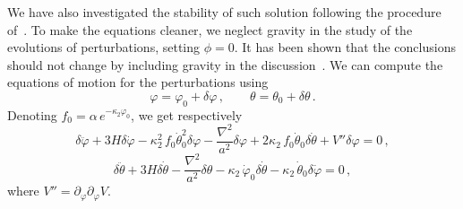 \documentclass[11pt,a4paper]{article}
\begin{document}
We have also investigated the stability of such solution following the procedure of~\cite{Boyle:2001du, Kasuya:2001pr}. To make the equations cleaner, we neglect gravity in the study of the evolutions of perturbations, setting $\phi = 0$. It has been shown that the conclusions should not change by including gravity in the discussion~\cite{Boyle:2001du}. We can compute the equations of motion for the perturbations using
\begin{equation}
\varphi = \varphi_0 + \delta \varphi \,, \qquad \theta = \theta_0 + \delta \theta \,.
\end{equation}
Denoting $f_0 = \alpha \, e^{-\kappa_2 \varphi_0}$, we get respectively
\begin{equation}
\label{eq:EOMdeltavarphi}
\delta \ddot\varphi + 3 H \delta \dot\varphi - \kappa_2^2 \, f_0 \dot\theta_0^2 \delta \varphi - \frac{\nabla^2}{a^2} \delta \varphi + 2 \kappa_2 \, f_0 \dot\theta_0 \delta \dot\theta + V'' \delta \varphi = 0 \,,
\end{equation}
\begin{equation}
\label{eq:EOMdeltatheta}
\delta \ddot\theta + 3 H \delta \dot \theta - \frac{\nabla^2}{a^2} \delta \theta - \kappa_2 \, \dot\varphi_0 \delta \dot\theta - \kappa_2 \, \dot\theta_0 \delta \dot\varphi = 0 \,,
\end{equation}
where $V'' = \partial_\varphi \partial_\varphi V$.\\
\end{document}
